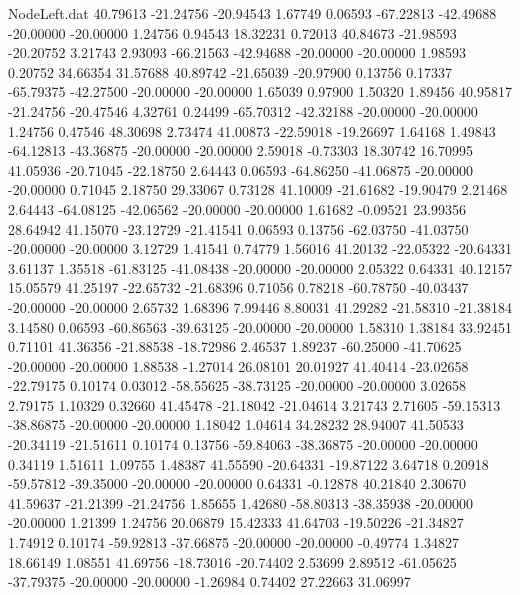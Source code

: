 \begin{filecontents}{NodeLeft.dat}
  40.79613  -21.24756  -20.94543     1.67749    0.06593  -67.22813  -42.49688  -20.00000  -20.00000    1.24756    0.94543   18.32231    0.72013
  40.84673  -21.98593  -20.20752     3.21743    2.93093  -66.21563  -42.94688  -20.00000  -20.00000    1.98593    0.20752   34.66354   31.57688
  40.89742  -21.65039  -20.97900     0.13756    0.17337  -65.79375  -42.27500  -20.00000  -20.00000    1.65039    0.97900    1.50320    1.89456
  40.95817  -21.24756  -20.47546     4.32761    0.24499  -65.70312  -42.32188  -20.00000  -20.00000    1.24756    0.47546   48.30698    2.73474
  41.00873  -22.59018  -19.26697     1.64168    1.49843  -64.12813  -43.36875  -20.00000  -20.00000    2.59018   -0.73303   18.30742   16.70995
  41.05936  -20.71045  -22.18750     2.64443    0.06593  -64.86250  -41.06875  -20.00000  -20.00000    0.71045    2.18750   29.33067    0.73128
  41.10009  -21.61682  -19.90479     2.21468    2.64443  -64.08125  -42.06562  -20.00000  -20.00000    1.61682   -0.09521   23.99356   28.64942
  41.15070  -23.12729  -21.41541     0.06593    0.13756  -62.03750  -41.03750  -20.00000  -20.00000    3.12729    1.41541    0.74779    1.56016
  41.20132  -22.05322  -20.64331     3.61137    1.35518  -61.83125  -41.08438  -20.00000  -20.00000    2.05322    0.64331   40.12157   15.05579
  41.25197  -22.65732  -21.68396     0.71056    0.78218  -60.78750  -40.03437  -20.00000  -20.00000    2.65732    1.68396    7.99446    8.80031
  41.29282  -21.58310  -21.38184     3.14580    0.06593  -60.86563  -39.63125  -20.00000  -20.00000    1.58310    1.38184   33.92451    0.71101
  41.36356  -21.88538  -18.72986     2.46537    1.89237  -60.25000  -41.70625  -20.00000  -20.00000    1.88538   -1.27014   26.08101   20.01927
  41.40414  -23.02658  -22.79175     0.10174    0.03012  -58.55625  -38.73125  -20.00000  -20.00000    3.02658    2.79175    1.10329    0.32660
  41.45478  -21.18042  -21.04614     3.21743    2.71605  -59.15313  -38.86875  -20.00000  -20.00000    1.18042    1.04614   34.28232   28.94007
  41.50533  -20.34119  -21.51611     0.10174    0.13756  -59.84063  -38.36875  -20.00000  -20.00000    0.34119    1.51611    1.09755    1.48387
  41.55590  -20.64331  -19.87122     3.64718    0.20918  -59.57812  -39.35000  -20.00000  -20.00000    0.64331   -0.12878   40.21840    2.30670
  41.59637  -21.21399  -21.24756     1.85655    1.42680  -58.80313  -38.35938  -20.00000  -20.00000    1.21399    1.24756   20.06879   15.42333
  41.64703  -19.50226  -21.34827     1.74912    0.10174  -59.92813  -37.66875  -20.00000  -20.00000   -0.49774    1.34827   18.66149    1.08551
  41.69756  -18.73016  -20.74402     2.53699    2.89512  -61.05625  -37.79375  -20.00000  -20.00000   -1.26984    0.74402   27.22663   31.06997

\end{filecontents}
